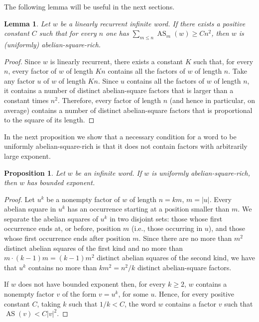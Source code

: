 \documentclass[11pt,reqno]{amsart}
\numberwithin{equation}{section}
\theoremstyle{plain}
\newtheorem{lemma}[theorem]{Lemma}
\newtheorem{proposition}[theorem]{Proposition}
\theoremstyle{definition}
\theoremstyle{remark}
\DeclareMathOperator{\AS}{AS}
\newcommand{\ass}[2]{\AS_{#2}(#1)}
\newcommand{\as}[1]{\AS(#1)}
\begin{document}
The following lemma will be useful in the next sections.

\begin{lemma}\label{lem:lin}
 Let $w$ be a linearly recurrent infinite word. If there exists a positive constant $C$ such that for every 
 $n$ one has $\sum_{m\leq n}\ass{w} {m}\geq Cn^2$, then $w$ is (uniformly) abelian-square-rich. 
\end{lemma}

\begin{proof}
Since $w$ is linearly recurrent,  there exists a constant $K$ such that, for every $n$, every factor of $w$ of length $Kn$ contains all the factors of $w$ of length $n$. Take any factor $u$ of $w$ of length $Kn$. Since $u$ contains all the factors of $w$ of length $n$, it contains a number of distinct abelian-square factors that is larger than a constant times $n^2$. Therefore, every factor of length $n$ (and hence in particular, on average) contains a number of distinct abelian-square factors that is proportional to the square of its length.
\end{proof}

In the next proposition we show that a necessary condition for a word to be uniformly abelian-square-rich is that it does not contain factors with arbitrarily large exponent.

\begin{proposition}\label{prop:new}
Let $w$ be an infinite word. If $w$ is uniformly abelian-square-rich, then $w$ has bounded exponent.
\end{proposition}

\begin{proof} 
Let $u^k$ be a nonempty factor of $w$ of length $n=km$, $m=|u|$. Every abelian square in $u^k$ has an occurrence starting at a position smaller than $m$. We separate the abelian squares of $u^k$ in two disjoint sets: those whose first occurrence ends at, or before, position $m$ (i.e., those occurring in $u$), and those whose first occurrence ends after position $m$. Since there are no more than $m^2$ distinct abelian squares of the first kind and no more than $m\cdot (k-1)m=(k-1)m^2$ distinct abelian squares of the second kind, we have that $u^k$ contains no more than $km^2=n^2/k$ distinct abelian-square factors. 
 
If $w$ does not have bounded exponent then, for every $k\geq 2$, $w$ contains a nonempty factor $v$ of the form $v=u^k$, for some $u$. Hence, for every positive constant $C$, taking $k$ such that $1/k<C$, the word $w$ contains a factor $v$ such that $\as{v} < C |v|^2$.
\end{proof}
\end{document}
